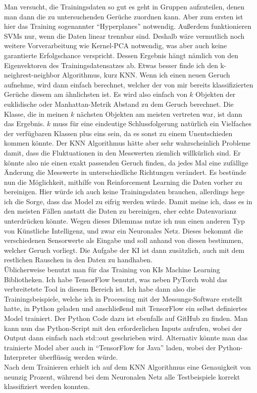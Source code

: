 \documentclass[10pt]{article}
\begin{document}
Man versucht, die Trainingsdaten so gut es geht in Gruppen aufzuteilen, denen man dann die zu untersuchenden Gerüche zuordnen kann. Aber zum ersten ist
hier das Training sogenannter "`Hyperplanes"' notwendig. Außerdem funktionieren SVMs nur, wenn die Daten linear trennbar sind.
Deshalb wäre vermutlich noch weitere Vorverarbeitung wie Kernel-PCA notwendig, was aber auch keine garantierte Erfolgschance verspricht. Dessen Ergebnis hängt
nämlich von den Eigenvektoren des Trainingsdatensatzes ab. Etwas besser finde ich den k-neighrest-neighbor Algorithmus, kurz KNN. Wenn ich einen neuen Geruch aufnehme, wird dann einfach berechnet, 
welcher der von mir bereits klassifizierten Gerüche diesem am ähnlichsten ist. Es wird also einfach von $k$ Objekten der euklidische oder Manhattan-Metrik Abstand
zu dem Geruch berechnet. Die Klasse, die in meinen $k$ nächsten Objekten am meisten vertreten war, ist dann das Ergebnis. $k$ muss für eine eindeutige 
Schlussfolgerung natürlich ein Vielfaches der verfügbaren Klassen plus eins sein, da es sonst zu einem Unentschieden kommen könnte. Der KNN Algorithmus hätte aber sehr wahrscheinlich Probleme
damit, dass die Fluktuationen in den Messwerten ziemlich willkürlich sind. Er könnte also nie einen exakt passenden Geruch finden, da jedes Mal eine zufällige Änderung die Messwerte
in unterschiedliche Richtungen verändert. Es bestünde nun die Möglichkeit, mithilfe von Reinforcement Learning die Daten vorher zu bereinigen. Hier würde ich auch keine Trainingsdaten brauchen,
allerdings hege ich die Sorge, dass das Model zu eifrig werden würde. Damit meine ich, dass es in den meisten Fällen anstatt die Daten zu bereinigen, eher echte Datenvarianz unterdrücken könnte. 
Wegen dieses Dilemmas nutze ich nun einen anderen Typ von Künstliche Intelligenz, und zwar ein Neuronales Netz. Dieses bekommt die verschiedenen Sensorwerte als Eingabe und soll anhand von
diesen bestimmen, welcher Geruch vorliegt. Die Aufgabe der KI ist dann zusätzlich, auch mit dem restlichen Rauschen in den Daten zu handhaben.\\
Üblicherweise benutzt man für das Training von KIs Machine Learning Bibliotheken. Ich habe TensorFlow benutzt, was neben PyTorch wohl das verbreitetste
Tool in diesem Bereich ist. Ich habe dann also die Trainingsbeispiele, welche ich in Processing mit der Messungs-Software erstellt hatte, in Python geladen und anschließend
mit TensorFlow ein selbst definiertes Model trainiert. Der Python Code dazu ist ebenfalls auf GitHub zu finden. Man kann nun das Python-Script mit den erforderlichen Inputs aufrufen, wobei
der Output dann einfach nach std::out geschrieben wird. Alternativ könnte man das trainierte Model aber auch in "`TensorFlow for Java"' \autocite{TFJava} laden, wobei der
Python-Interpreter überflüssig werden würde.\\
Nach dem Trainieren erhielt ich auf dem KNN Algorithmus eine Genauigkeit von neunzig Prozent, während bei dem Neuronalen Netz
alle Testbeispiele korrekt klassifiziert werden konnten.
\end{document}

